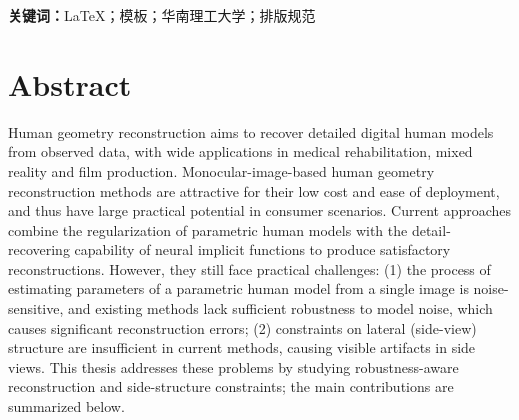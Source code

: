 

\par \vspace{1em} %
\noindent \textbf{关键词：}LaTeX；模板；华南理工大学；排版规范


\chapter[Abstract]{Abstract}

Human geometry reconstruction aims to recover detailed digital human models from observed data, with wide applications in medical rehabilitation, mixed reality and film production. Monocular-image-based human geometry reconstruction methods are attractive for their low cost and ease of deployment, and thus have large practical potential in consumer scenarios. Current approaches combine the regularization of parametric human models with the detail-recovering capability of neural implicit functions to produce satisfactory reconstructions. However, they still face practical challenges: (1) the process of estimating parameters of a parametric human model from a single image is noise-sensitive, and existing methods lack sufficient robustness to model noise, which causes significant reconstruction errors; (2) constraints on lateral (side-view) structure are insufficient in current methods, causing visible artifacts in side views. This thesis addresses these problems by studying robustness-aware reconstruction and side-structure constraints; the main contributions are summarized below.

